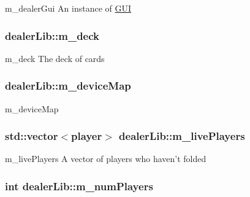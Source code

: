 m\-\_\-dealer\-Gui An instance of \hyperlink{namespaceGUI}{G\-U\-I} 

\hypertarget{classdealerLib_af93b35d9721bd502dbfb466992dcb55d}{
\subsubsection[{m\-\_\-deck}]{ dealer\-Lib\-::m\-\_\-deck\hspace{0.3cm}{\ttfamily [private]}}}\label{classdealerLib_af93b35d9721bd502dbfb466992dcb55d}


m\-\_\-deck The deck of cards 

\hypertarget{classdealerLib_a3e872bd8878756753531b3cc3d3a93aa}{
\subsubsection[{m\-\_\-device\-Map}]{ dealer\-Lib\-::m\-\_\-device\-Map\hspace{0.3cm}{\ttfamily [private]}}}\label{classdealerLib_a3e872bd8878756753531b3cc3d3a93aa}


m\-\_\-device\-Map 

\hypertarget{classdealerLib_a09924daffb60be0817dbdceb7e66cdfd}{
\subsubsection[{m\-\_\-live\-Players}]{\setlength{\rightskip}{0pt plus 5cm}std\-::vector$<${\bf player}$>$ dealer\-Lib\-::m\-\_\-live\-Players\hspace{0.3cm}{\ttfamily [private]}}}\label{classdealerLib_a09924daffb60be0817dbdceb7e66cdfd}


m\-\_\-live\-Players A vector of players who haven't folded 

\hypertarget{classdealerLib_ab67ad8aae4bd1d568f7ff544e77637ad}{
\subsubsection[{m\-\_\-num\-Players}]{\setlength{\rightskip}{0pt plus 5cm}int dealer\-Lib\-::m\-\_\-num\-Players\hspace{0.3cm}{\ttfamily [private]}}}\label{classdealerLib_ab67ad8aae4bd1d568f7ff544e77637ad}


